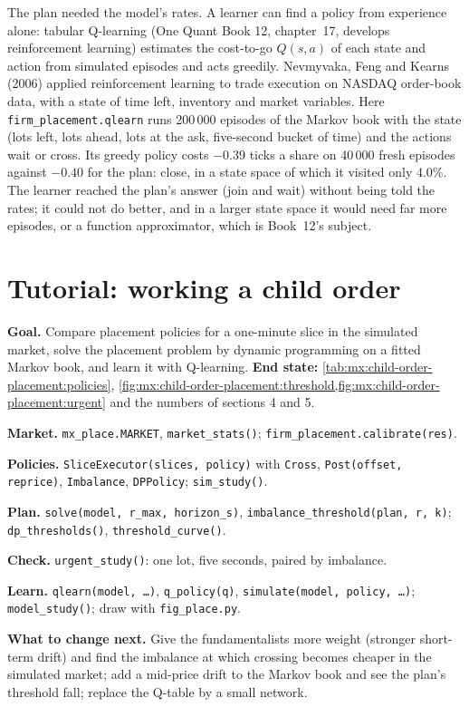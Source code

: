The plan needed the model's rates. A learner can find a policy from experience alone: tabular Q-learning (One Quant Book 12, chapter~17, develops
reinforcement learning) estimates the cost-to-go $Q(s,a)$ of each state and action from simulated episodes and acts greedily. Nevmyvaka, Feng and
Kearns (2006) applied reinforcement learning to trade execution on NASDAQ order-book data, with a state of time left, inventory and market variables.
Here \texttt{firm\_placement.qlearn} runs 200\,000 episodes of the Markov book with the state (lots left, lots ahead, lots at the ask, five-second
bucket of time) and the actions wait or cross. Its greedy policy costs $-0.39$ ticks a share on 40\,000 fresh episodes against $-0.40$ for the plan:
close, in a state space of which it visited only 4.0\%. The learner reached the plan's answer (join and wait) without being told the rates; it could
not do better, and in a larger state space it would need far more episodes, or a function approximator, which is Book~12's subject.

\section{Tutorial: working a child order}\label{tut:mx:child-order-placement:tut}

\begin{tutorial}
\textbf{Goal.} Compare placement policies for a one-minute slice in the simulated market, solve the placement problem by dynamic programming on a
fitted Markov book, and learn it with Q-learning.
\textbf{End state:} \cref{tab:mx:child-order-placement:policies}, \cref{fig:mx:child-order-placement:threshold,fig:mx:child-order-placement:urgent}
and the numbers of sections 4 and 5.
\begin{tutsteps}
\item \textbf{Market.} \texttt{mx\_place.MARKET}, \texttt{market\_stats()}; \texttt{firm\_placement.calibrate(res)}.
\item \textbf{Policies.} \texttt{SliceExecutor(slices, policy)} with \texttt{Cross}, \texttt{Post(offset, reprice)}, \texttt{Imbalance},
\texttt{DPPolicy}; \texttt{sim\_study()}.
\item \textbf{Plan.} \texttt{solve(model, r\_max, horizon\_s)}, \texttt{imbalance\_threshold(plan, r, k)}; \texttt{dp\_thresholds()},
\texttt{threshold\_curve()}.
\item \textbf{Check.} \texttt{urgent\_study()}: one lot, five seconds, paired by imbalance.
\item \textbf{Learn.} \texttt{qlearn(model, \dots)}, \texttt{q\_policy(q)}, \texttt{simulate(model, policy, \dots)}; \texttt{model\_study()}; draw
with \texttt{fig\_place.py}.
\end{tutsteps}
\textbf{What to change next.} Give the fundamentalists more weight (stronger short-term drift) and find the imbalance at which crossing becomes
cheaper in the simulated market; add a mid-price drift to the Markov book and see the plan's threshold fall; replace the Q-table by a small network.
\end{tutorial}

